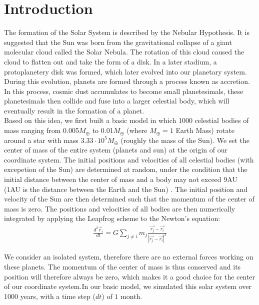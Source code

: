\section{Introduction}
The formation of the Solar System is described by the Nebular Hypothesis. It is suggested that the Sun was born from the gravitational collapse of a giant molecular cloud called the Solar Nebula. 
The rotation of this cloud caused the cloud to flatten out and take the form of a disk. In a later stadium, a protoplanetery disk was formed, which later evolved into our planetary system.
During this evolution, planets are formed through a process known as accretion. 
In this process, cosmic dust accumulates to become small planetesimals, these planetesimals then collide and fuse into a larger celestial body, which will eventually result in the formation of a planet.\\

Based on this idea, we first built a basic model in which 1000 celestial bodies of mass ranging from 0.005$M_{\oplus}$ to 0.01$M_{\oplus}$ (where $M_{\oplus}=1$ Earth Mass)  rotate around a star with mass $3.33\cdot 10^5 M_{\oplus}$ (roughly the mass of the Sun).
We set the center of mass of the entire system (planets and sun) at the origin of our coordinate system. The initial positions and velocities of all celestial bodies (with excepetion of the Sun) are determined at random, under the condition that the initial distance between the center of mass and a body may not exceed 9AU (1AU is the distance between the Earth and the Sun) . The initial position and velocity of the Sun are then determined such that the momentum of the center of mass is zero. The positions and velocities of all bodies are then numerically integrated by applying the Leapfrog scheme to the Newton's equation:
\begin{align}
\frac{d^2\vec{r}_i}{dt}=G\sum_{j\neq i}m_j\frac{\vec{r_j}-\vec{r_i}}{|\vec{r_j}-\vec{r_i}|^3}
\end{align}



We consider an isolated system, therefore there are no external forces working on these planets. The momentum of the center of mass is thus conserved and its position will therefore always be zero, which makes it a good choice for the center of our coordinate system.In our basic model, we simulated this solar system over 1000 years, with a time step (\(dt\)) of $1$ month.\\

